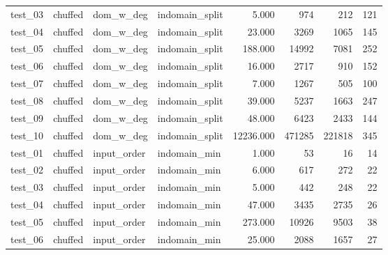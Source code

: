 \begin{longtable}{l l l l r r r r}
    test\_03         & chuffed         & dom\_w\_deg       & indomain\_split   & 5.000              & 974            & 212               & 121            \\
    test\_04         & chuffed         & dom\_w\_deg       & indomain\_split   & 23.000             & 3269           & 1065              & 145            \\
    test\_05         & chuffed         & dom\_w\_deg       & indomain\_split   & 188.000            & 14992          & 7081              & 252            \\
    test\_06         & chuffed         & dom\_w\_deg       & indomain\_split   & 16.000             & 2717           & 910               & 152            \\
    test\_07         & chuffed         & dom\_w\_deg       & indomain\_split   & 7.000              & 1267           & 505               & 100            \\
    test\_08         & chuffed         & dom\_w\_deg       & indomain\_split   & 39.000             & 5237           & 1663              & 247            \\
    test\_09         & chuffed         & dom\_w\_deg       & indomain\_split   & 48.000             & 6423           & 2433              & 144            \\
    test\_10         & chuffed         & dom\_w\_deg       & indomain\_split   & 12236.000          & 471285         & 221818            & 345            \\
    \midrule
    test\_01         & chuffed         & input\_order      & indomain\_min     & 1.000              & 53             & 16                & 14             \\
    test\_02         & chuffed         & input\_order      & indomain\_min     & 6.000              & 617            & 272               & 22             \\
    test\_03         & chuffed         & input\_order      & indomain\_min     & 5.000              & 442            & 248               & 22             \\
    test\_04         & chuffed         & input\_order      & indomain\_min     & 47.000             & 3435           & 2735              & 26             \\
    test\_05         & chuffed         & input\_order      & indomain\_min     & 273.000            & 10926          & 9503              & 38             \\
    test\_06         & chuffed         & input\_order      & indomain\_min     & 25.000             & 2088           & 1657              & 27             \\

\end{longtable}
